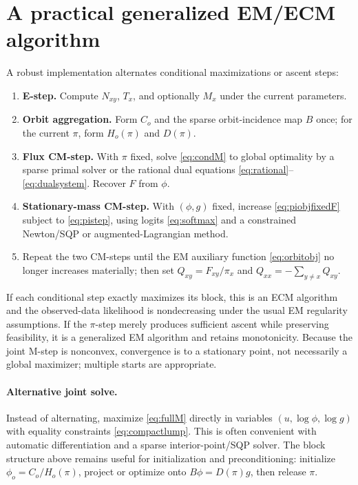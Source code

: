 \documentclass[10pt]{article}
\begin{document}
\section{A practical generalized EM/ECM algorithm}
A robust implementation alternates conditional maximizations or ascent steps:
\begin{enumerate}
\item \textbf{E-step.} Compute $N_{xy}$, $T_x$, and optionally $M_x$ under the current parameters.
\item \textbf{Orbit aggregation.} Form $C_o$ and the sparse orbit-incidence map $B$ once; for the current $\pi$, form $H_o(\pi)$ and $D(\pi)$.
\item \textbf{Flux CM-step.} With $\pi$ fixed, solve \eqref{eq:condM} to global optimality by a sparse primal solver or the rational dual equations \eqref{eq:rational}--\eqref{eq:dualsystem}.  Recover $F$ from $\phi$.
\item \textbf{Stationary-mass CM-step.} With $(\phi,g)$ fixed, increase \eqref{eq:piobjfixedF} subject to \eqref{eq:pistep}, using logits \eqref{eq:softmax} and a constrained Newton/SQP or augmented-Lagrangian method.
\item Repeat the two CM-steps until the EM auxiliary function \eqref{eq:orbitobj} no longer increases materially; then set $Q_{xy}=F_{xy}/\pi_x$ and $Q_{xx}=-\sum_{y\ne x}Q_{xy}$.
\end{enumerate}
If each conditional step exactly maximizes its block, this is an ECM algorithm and the observed-data likelihood is nondecreasing under the usual EM regularity assumptions.  If the $\pi$-step merely produces sufficient ascent while preserving feasibility, it is a generalized EM algorithm and retains monotonicity.  Because the joint M-step is nonconvex, convergence is to a stationary point, not necessarily a global maximizer; multiple starts are appropriate.

\paragraph{Alternative joint solve.}
Instead of alternating, maximize \eqref{eq:fullM} directly in variables $(u,\log\phi,\log g)$ with equality constraints \eqref{eq:compactlump}.  This is often convenient with automatic differentiation and a sparse interior-point/SQP solver.  The block structure above remains useful for initialization and preconditioning: initialize $\phi_o=C_o/H_o(\pi)$, project or optimize onto $B\phi=D(\pi)g$, then release $\pi$.
\end{document}
